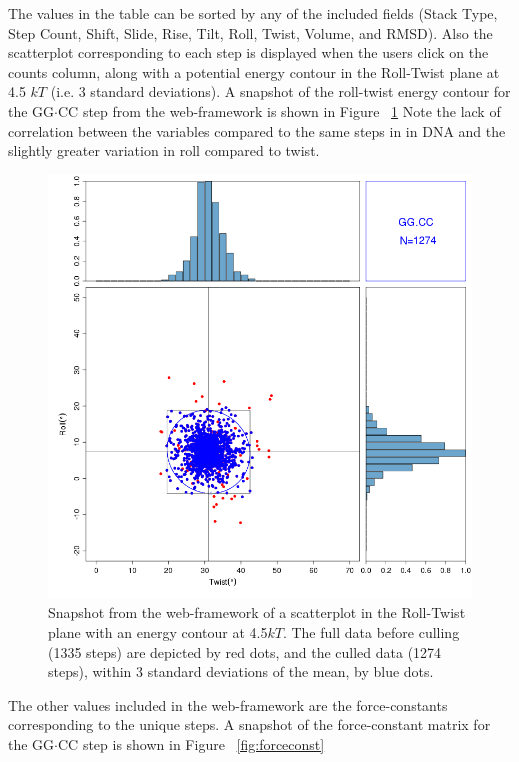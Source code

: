 The values  in the table can be  sorted by any of  the included fields
(Stack  Type,  Step Count,  Shift,  Slide,  Rise,  Tilt, Roll,  Twist,
Volume, and RMSD). Also the  scatterplot corresponding to each step is
displayed  when the users  click on  the counts  column, along  with a
potential energy contour in the  Roll-Twist plane at 4.5 $kT$ (i.e.  3
standard deviations).  A snapshot of the roll-twist energy contour for
the  GG$\cdot$CC  step  from  the  web-framework is  shown  in  Figure
~\ref{fig:contour} Note the lack  of correlation between the variables
compared to the same steps  in in DNA \cite{olson1998, olson2009c} and
the slightly greater variation in roll compared to twist.
\begin{figure}[htbp]
\centering
\includegraphics[angle=0, scale=0.54]{Chapter4/GG_CC.png}
\caption{Snapshot  from  the web-framework  of  a  scatterplot in  the
  Roll-Twist plane  with an energy  contour at 4.5$kT$. The  full data
  before culling (1335 steps) are depicted by red dots, and the culled
  data (1274 steps), within 3 standard deviations of the mean, by blue
  dots.}
\label{fig:contour}
\end{figure}

The other values included in the web-framework are the force-constants
corresponding to  the unique steps.  A snapshot of  the force-constant
matrix    for   the    GG$\cdot$CC   step    is   shown    in   Figure
~\ref{fig:forceconst}

